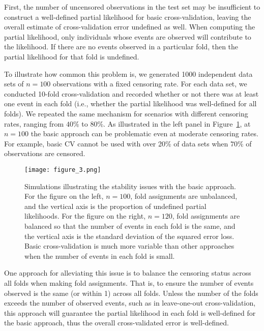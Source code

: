 First, the number of uncensored observations in the test set may be insufficient to construct a well-defined partial likelihood for basic cross-validation, leaving the overall estimate of cross-validation error undefined as well. When computing the partial likelihood, only individuals whose events are observed will contribute to the likelihood. If there are no events observed in a particular fold, then the partial likelihood for that fold is undefined. 

To illustrate how common this problem is, we generated 1000 independent data sets of $n = 100$ observations with a fixed censoring rate. For each data set, we conducted 10-fold cross-validation and recorded whether or not there was at least one event in each fold (i.e., whether the partial likelihood was well-defined for all folds). We repeated the same mechanism for scenarios with different censoring rates, ranging from $40\%$ to $80\%$. As illustrated in the left panel in Figure~\ref{Fig:stability}, at $n=100$ the basic approach can be problematic even at moderate censoring rates. For example, basic CV cannot be used with over 20\% of data sets when $70\%$ of observations are censored.

\begin{figure}[!htb]
  \centering
  \texttt{[image: figure\_3.png]}
  \caption{\label{Fig:stability} Simulations illustrating the stability issues with the basic approach. For the figure on the left, $n = 100$, fold assignments are unbalanced, and the vertical axis is the proportion of undefined partial likelihoods. For the figure on the right, $n = 120$, fold assignments are balanced so that the number of events in each fold is the same, and the vertical axis is the standard deviation of the squared error loss. Basic cross-validation is much more variable than other approaches when the number of events in each fold is small.}
\end{figure}

One approach for alleviating this issue is to balance the censoring status across all folds when making fold assignments. That is, to ensure the number of events observed is the same (or within 1) across all folds. Unless the number of the folds exceeds the number of observed events, such as in leave-one-out cross-validation, this approach will guarantee the partial likelihood in each fold is well-defined for the basic approach, thus the overall cross-validated error is well-defined. 

